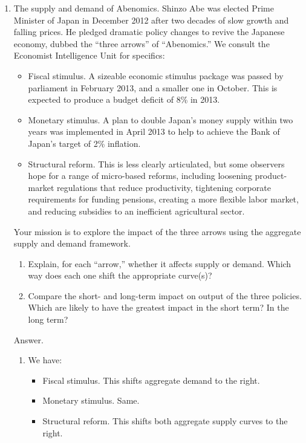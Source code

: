 \begin{enumerate}
\item The supply and demand of Abenomics.
Shinzo Abe was elected Prime Minister of Japan in December 2012
after two decades of slow growth and falling prices.
He pledged dramatic policy changes to revive the Japanese economy,
dubbed the ``three arrows'' of ``Abenomics.''
We consult the Economist Intelligence Unit for specifics:
%
\begin{itemize}
\item Fiscal stimulus.  A sizeable economic stimulus package was passed by parliament in
February 2013, and a smaller one in October.
This is expected to produce a budget deficit of 8\% in 2013.
\item Monetary stimulus. A plan to double Japan's
money supply within two years was implemented in April 2013 to help to achieve the Bank of Japan's
target of 2\%  inflation.
\item Structural reform.
This is less clearly articulated, but some observers hope for a range of micro-based reforms,
including loosening product-market regulations that reduce productivity,
tightening corporate requirements for funding pensions,
creating a more flexible labor market,
and reducing subsidies to an inefficient agricultural sector.
\end{itemize}
%
Your mission is to explore the impact of the three arrows using the aggregate supply and demand
framework.
\begin{enumerate}
\item Explain, for each ``arrow,'' whether it affects supply or demand.
Which way does each one shift the appropriate curve(s)?
\item Compare the short- and long-term impact on output of the three policies.
Which are likely to have the greatest impact in the short term?
In the long term?
\end{enumerate}

Answer.
\begin{enumerate}
\item We have:
\begin{itemize}
\item Fiscal stimulus. This shifts aggregate demand to the right.
\item Monetary stimulus. Same.
\item Structural reform. This shifts both aggregate supply curves to the right.
\end{itemize}


\end{enumerate}
\end{enumerate}
